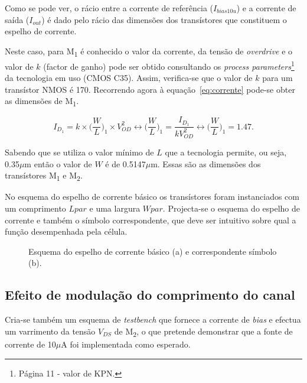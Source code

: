 \documentclass[11pt]{article}
\numberwithin{equation}{section}
\begin{document}
\vspace{2mm}
Como se pode ver, o rácio entre a corrente de referência ($I_{bias10u}$) e a corrente de saída ($I_{out}$) é dado pelo rácio das dimensões dos transístores que constituem o espelho de corrente.

Neste caso, para M\textsubscript{1} é conhecido o valor da corrente, da tensão de \textit{overdrive} e o valor de $k$ (factor de ganho) pode ser obtido consultando os \textit{process parameters}\footnote{Página 11 - valor de KPN.} da tecnologia em uso (CMOS C35). Assim, verifica-se que o valor de $k$ para um transístor NMOS é 170. Recorrendo agora à equação~\ref{eq:corrente} pode-se obter as dimensões de M\textsubscript{1}.

\vspace{-3mm}
\begin{equation}
I_{D_{1}} = k\times \Big(\frac{W}{L}\Big)_{1} \times V_{OD}^2 \leftrightarrow \Big(\frac{W}{L}\Big)_{1} = \frac{I_{D_{1}}}{kV_{OD}^2} \leftrightarrow \Big(\frac{W}{L}\Big)_{1} = 1.47.
\end{equation}

\vspace{1mm}
Sabendo que se utiliza o valor mínimo de $L$ que a tecnologia permite, ou seja, 0.35$\mu$m então o valor de $W$ é de 0.5147$\mu$m. Essas são as dimensões dos transístores M\textsubscript{1} e M\textsubscript{2}.

No esquema do espelho de corrente básico os transístores foram instanciados com um comprimento $Lpar$ e uma largura $Wpar$. Projecta-se o esquema do espelho de corrente e também o símbolo correspondente, que deve ser intuitivo sobre qual a função desempenhada pela célula.

\begin{figure}[H]
	\centering
	\hspace{2mm}
	\vspace{-0.8em}
	\caption{Esquema do espelho de corrente básico (a) e correspondente símbolo (b).}
    \vspace{-0.8em}
\end{figure}

\subsection{Efeito de modulação do comprimento do canal}

Cria-se também um esquema de \textit{testbench} que fornece a corrente de \textit{bias} e efectua um varrimento da tensão $V_{DS}$ de M\textsubscript{2}, o que pretende demonstrar que a fonte de corrente de 10$\mu$A foi implementada como esperado.
\end{document}
